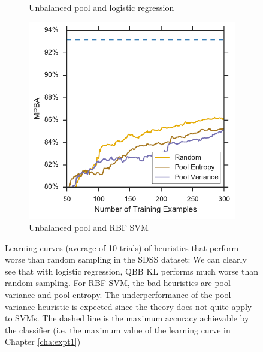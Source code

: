 \begin{figure}[p]
\begin{subfigure}{.5\textwidth}
		\caption{Unbalanced pool and logistic regression}
		\label{fig:sdss_ul_ind_lower}
	\end{subfigure}%
	\begin{subfigure}{.5\textwidth}
		\centering
		\includegraphics[width=\linewidth]{figures/5_active/sdss_ur_ind_lower}
		\caption{Unbalanced pool and RBF SVM}
		\label{fig:sdss_ur_ind_lower}
	\end{subfigure}
	\caption[Learning curves of heuristics worse than random (SDSS)]{ Learning curves (average of 10
        trials) of heuristics that perform worse than random sampling in the SDSS dataset: We can clearly
        see that with logistic regression, QBB KL performs much worse than random sampling. For RBF SVM,
        the bad heuristics are pool variance and pool entropy. The underperformance of the pool variance
        heuristic is expected since the theory does not quite apply to SVMs. The dashed line is the maximum
        accuracy achievable by the classifier (i.e. the maximum value of the learning curve in Chapter
        \ref{cha:expt1})} \label{fig:sdss_ind_lower}
\end{figure}


